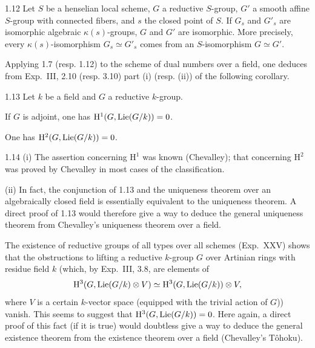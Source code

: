 \begin{corollary}{1.12}\label{XXIV.1.12}
Let $S$ be a henselian local scheme, $G$ a reductive $S$-group, $G'$ a smooth affine $S$-group with connected fibers, and $s$ the closed point of $S$. If $G_s$ and $G'_s$ are isomorphic algebraic $\kappa(s)$-groups, $G$ and $G'$ are isomorphic. More precisely, every $\kappa(s)$-isomorphism $G_s\simeq G'_s$ comes from an $S$-isomorphism $G\simeq G'$.
\end{corollary}
Applying 1.7 (resp. 1.12) to the scheme of dual numbers over a field, one deduces from Exp.~III, 2.10 (resp. 3.10) part (i) (resp. (ii)) of the following corollary.
\begin{corollary}{1.13}\label{XXIV.1.13}
Let $k$ be a field and $G$ a reductive $k$-group.
\begin{enumeratei}
\item If $G$ is adjoint, one has $\mathrm H^1(G,\operatorname{Lie}(G/k))=0$.
\item One has $\mathrm H^2(G,\operatorname{Lie}(G/k))=0$.
\end{enumeratei}
\end{corollary}
\begin{remark}{1.14}\label{XXIV.1.14}
(i) The assertion concerning $\mathrm H^1$ was known (Chevalley); that concerning $\mathrm H^2$ was proved by Chevalley in most cases of the classification.

(ii) In fact, the conjunction of 1.13 and the uniqueness theorem over an algebraically closed field is essentially equivalent to the uniqueness theorem. A direct proof of 1.13 would therefore give a way to deduce the general uniqueness theorem from Chevalley's uniqueness theorem over a field.

The existence of reductive groups of all types over all schemes (Exp.~XXV) shows that the obstructions to lifting a reductive $k$-group $G$ over Artinian rings with residue field $k$ (which, by Exp.~III, 3.8, are elements of
\[
\mathrm H^3(G,\operatorname{Lie}(G/k)\otimes V)\simeq\mathrm H^3(G,\operatorname{Lie}(G/k))\otimes V,
\]
where $V$ is a certain $k$-vector space (equipped with the trivial action of $G$)) vanish. This seems to suggest that $\mathrm H^3(G,\operatorname{Lie}(G/k))=0$. Here again, a direct proof of this fact (if it is true) would doubtless give a way to deduce the general existence theorem from the existence theorem over a field (Chevalley's Tôhoku).
\end{remark}
